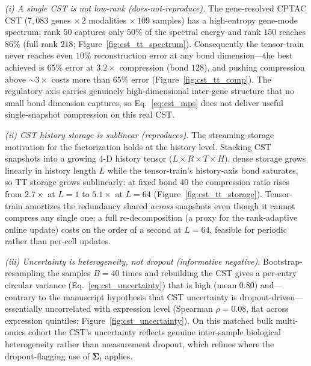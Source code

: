\documentclass[preprint,12pt,amsmath,amssymb,superscriptaddress,floatfix]{revtex4-2}
\begin{document}
\emph{(i) A single CST is not low-rank (does-not-reproduce).} The gene-resolved
CPTAC CST ($7{,}083$ genes $\times\,2$ modalities $\times\,109$ samples) has a
high-entropy gene-mode spectrum: rank $50$ captures only $50\%$ of the spectral
energy and rank $150$ reaches $86\%$ (full rank $218$;
Figure~\ref{fig:cst_tt_spectrum}). Consequently the tensor-train never reaches
even $10\%$ reconstruction error at any bond dimension---the best achieved is
$65\%$ error at $3.2\times$ compression (bond $128$), and pushing compression
above $\sim3\times$ costs more than $65\%$ error
(Figure~\ref{fig:cst_tt_comp}). The regulatory axis carries genuinely
high-dimensional inter-gene structure that no small bond dimension captures, so
Eq.~\ref{eq:cst_mps} does not deliver useful single-snapshot compression on this
real CST.

\emph{(ii) CST history storage is sublinear (reproduces).} The streaming-storage
motivation for the factorization holds at the history level. Stacking CST
snapshots into a growing 4-D history tensor ($L\times R\times T\times H$), dense
storage grows linearly in history length $L$ while the tensor-train's
history-axis bond saturates, so TT storage grows sublinearly: at fixed bond $40$
the compression ratio rises from $2.7\times$ at $L=1$ to $5.1\times$ at $L=64$
(Figure~\ref{fig:cst_tt_storage}). Tensor-train amortizes the redundancy shared
\emph{across} snapshots even though it cannot compress any single one; a full
re-decomposition (a proxy for the rank-adaptive online update) costs on the
order of a second at $L=64$, feasible for periodic rather than per-cell updates.

\emph{(iii) Uncertainty is heterogeneity, not dropout (informative negative).}
Bootstrap-resampling the samples $B=40$ times and rebuilding the CST gives a
per-entry circular variance (Eq.~\ref{eq:cst_uncertainty}) that is high
(mean $0.80$) and---contrary to the manuscript hypothesis that CST uncertainty
is dropout-driven---essentially uncorrelated with expression level (Spearman
$\rho=0.08$, flat across expression quintiles;
Figure~\ref{fig:cst_uncertainty}). On this matched bulk multi-omics cohort the
CST's uncertainty reflects genuine inter-sample biological heterogeneity rather
than measurement dropout, which refines where the dropout-flagging use of
$\boldsymbol{\Sigma}_t$ applies.
\end{document}
